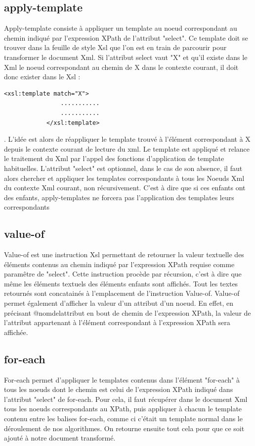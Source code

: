     \subsection{apply-template}
        Apply-template consiste à appliquer un template au noeud correspondant au chemin indiqué par l'expression XPath de l'attribut "select". Ce template doit se trouver dans la feuille de style Xsl que l'on est en train de parcourir pour transformer le document Xml. Si l'attribut select vaut "X" et qu'il existe dans le Xml le noeud correspondant au chemin de X dans le contexte courant, il doit donc exister dans le Xsl :
        \begin{lstlisting}[frame=single]
            <xsl:template match="X">
                ...........
                ...........
            </xsl:template>
        \end{lstlisting}.
         L'idée est alors de réappliquer le template trouvé à l'élément correspondant à X depuis le contexte courant de lecture du xml.
         Le template est appliqué et relance le traitement du Xml par l'appel des fonctions d'application de template habituelles.
         L'attribut "select" est optionnel, dans le cas de son absence, il faut alors chercher et appliquer les templates correspondants à tous les Noeuds Xml du contexte Xml courant, non récursivement. C'est à dire que si ces enfants ont des enfants, apply-templates ne forcera pas l'application des templates leurs correspondants

    \subsection{value-of}
        Value-of est une instruction Xsl permettant de retourner la valeur textuelle des éléments contenus au chemin indiqué par l'expression XPath requise comme paramêtre de "select". Cette instruction procède par récursion, c'est à dire que même les éléments textuels des éléments enfants sont affichés. Tout les textes retournés sont concatainés à l'emplacement de l'instruction Value-of.
        Value-of permet également d'afficher la valeur d'un attribut d'un noeud. En effet, en précisant @nomdelattribut en bout de chemin de l'expression XPath, la valeur de l'attribut appartenant à l'élément correspondant à l'expression XPath sera affichée.

    \subsection{for-each}
        For-each permet d'appliquer le templates contenus dans l'élément "for-each" à tous les noeuds dont le chemin est celui de l'expression XPath indiqué dans l'attribut "select" de for-each. Pour cela, il faut récupérer dans le document Xml tous les noeuds correspondants au XPath, puis appliquer à chacun le template contenu entre les balises for-each, comme ci c'était un template normal dans le déroulement de nos algorithmes. On retourne ensuite tout cela pour que ce soit ajouté à notre document transformé.
